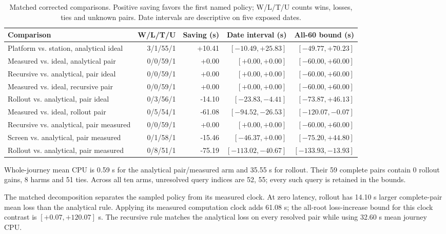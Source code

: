 \documentclass[preprint,12pt,authoryear]{elsarticle}
\begin{document}
\begin{table}[ht]
\centering\small\setlength{\tabcolsep}{4pt}
\caption{Matched corrected comparisons. Positive saving favors the first named policy; W/L/T/U counts wins, losses, ties and unknown pairs. Date intervals are descriptive on five exposed dates.}
\begin{tabular}{p{}rrrr}
\toprule
Comparison & W/L/T/U & Saving (s) & Date interval (s) & All-60 bound (s) \\
\midrule
Platform vs. station, analytical ideal & 3/1/55/1 & +10.41 & $[-10.49,+25.83]$ & $[-49.77,+70.23]$ \\
Measured vs. ideal, analytical pair & 0/0/59/1 & +0.00 & $[+0.00,+0.00]$ & $[-60.00,+60.00]$ \\
Recursive vs. analytical, pair ideal & 0/0/59/1 & +0.00 & $[+0.00,+0.00]$ & $[-60.00,+60.00]$ \\
Measured vs. ideal, recursive pair & 0/0/59/1 & +0.00 & $[+0.00,+0.00]$ & $[-60.00,+60.00]$ \\
Rollout vs. analytical, pair ideal & 0/3/56/1 & -14.10 & $[-23.83,-4.41]$ & $[-73.87,+46.13]$ \\
Measured vs. ideal, rollout pair & 0/5/54/1 & -61.08 & $[-94.52,-26.53]$ & $[-120.07,-0.07]$ \\
Recursive vs. analytical, pair measured & 0/0/59/1 & +0.00 & $[+0.00,+0.00]$ & $[-60.00,+60.00]$ \\
Screen vs. analytical, pair measured & 0/1/58/1 & -15.46 & $[-46.37,+0.00]$ & $[-75.20,+44.80]$ \\
Rollout vs. analytical, pair measured & 0/8/51/1 & -75.19 & $[-113.02,-40.67]$ & $[-133.93,-13.93]$ \\
\bottomrule
\end{tabular}
\end{table}

Whole-journey mean CPU is 0.59 s for the analytical pair/measured arm and 35.55 s for rollout. Their 59 complete pairs contain 0 rollout gains, 8 harms and 51 ties. Across all ten arms, unresolved query indices are 52, 55; every such query is retained in the bounds.

The matched decomposition separates the sampled policy from its measured clock. At zero latency, rollout has 14.10 s larger complete-pair mean loss than the analytical rule. Applying its measured computation clock adds 61.08 s; the all-root loss-increase bound for this clock contrast is $[+0.07,+120.07]$ s. The recursive rule matches the analytical loss on every resolved pair while using 32.60 s mean journey CPU.
\end{document}
